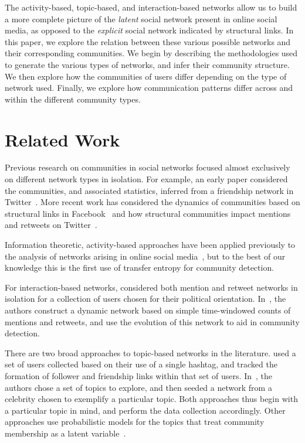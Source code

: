 The activity-based, topic-based, and interaction-based networks allow us to build a more complete picture of the \emph{latent} social network present in online social media, as opposed to the \emph{explicit} social network indicated by structural links. In this paper, we explore the relation between these various possible networks and their corresponding communities. We begin by describing the methodologies used to generate the various types of networks, and infer their community structure. We then explore how the communities of users differ depending on the type of network used. Finally, we explore how communication patterns differ across and within the different community types.

\section{Related Work}

Previous research on communities in social networks focused almost exclusively on different network types in isolation. For example, an early paper considered the communities, and associated statistics, inferred from a friendship network in Twitter~\cite{java2009we}. More recent work has considered the dynamics of communities based on structural links in Facebook~\cite{nguyen2011adaptive} and how structural communities impact mentions and retweets on Twitter~\cite{grabowicz2012social}.


Information theoretic, activity-based approaches have been applied previously to the analysis of networks arising in online social media~\cite{ver2012information,darmon2013detecting}, but to the best of our knowledge this is the first use of transfer entropy for community detection.

For interaction-based networks, \cite{conover2011political} considered both mention and retweet networks in isolation for a collection of users chosen for their political orientation. In~\cite{deitrick2013mutually}, the authors construct a dynamic network based on simple time-windowed counts of mentions and retweets, and use the evolution of this network to aid in community detection.

There are two broad approaches to topic-based networks in the literature. \cite{rossi2012conversation} used a set of users collected based on their use of a single hashtag, and tracked the formation of follower and friendship links within that set of users. In~\cite{lim2012following}, the authors chose a set of topics to explore, and then seeded a network from a celebrity chosen to exemplify a particular topic. Both approaches thus begin with a particular topic in mind, and perform the data collection accordingly. Other approaches use probabilistic models for the topics that treat community membership as a latent variable~\cite{yin2012latent}.

